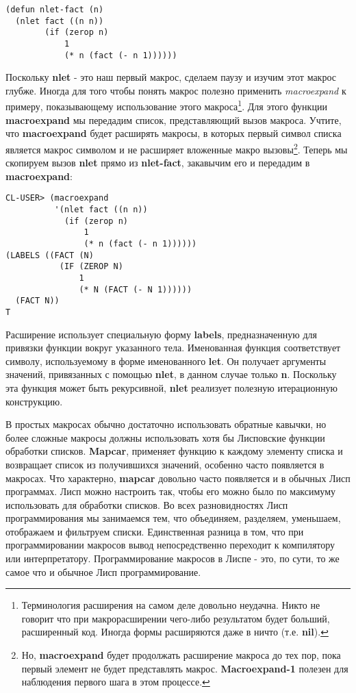 \begin{verbatim}
(defun nlet-fact (n)
  (nlet fact ((n n))
        (if (zerop n)
            1
            (* n (fact (- n 1))))))
\end{verbatim}

Поскольку \textbf{nlet} - это наш первый макрос, сделаем паузу и изучим этот макрос глубже. Иногда для того чтобы понять макрос полезно применить \emph{macroexpand} к примеру, показывающему использование этого макроса\footnote{Терминология расширения на самом деле довольно неудачна. Никто не говорит что при макрорасширении чего-либо результатом будет больший, расширенный код. Иногда формы расширяются даже в ничто (т.е. \textbf{nil}).}. Для этого функции \textbf{macroexpand} мы передадим список, представляющий вызов макроса. Учтите, что \textbf{macroexpand} будет расширять макросы, в которых первый символ списка является макрос символом и не расширяет вложенные макро вызовы\footnote{Но, \textbf{macroexpand} будет продолжать расширение макроса до тех пор, пока первый элемент не будет представлять макрос. \textbf{Macroexpand-1} полезен для наблюдения первого шага в этом процессе.}. Теперь мы скопируем вызов \textbf{nlet} прямо из \textbf{nlet-fact}, закавычим его и передадим в \textbf{macroexpand}:

\begin{verbatim}
CL-USER> (macroexpand
          '(nlet fact ((n n))
            (if (zerop n)
                1
                (* n (fact (- n 1))))))
(LABELS ((FACT (N)
           (IF (ZEROP N)
               1
               (* N (FACT (- N 1))))))
  (FACT N))
T
\end{verbatim}

Расширение использует специальную форму \textbf{labels}, предназначенную для привязки функции вокруг указанного тела. Именованная функция соответствует символу, используемому в форме именованного \textbf{let}. Он получает аргументы значений, привязанных с помощью \textbf{nlet}, в данном случае только \textbf{n}. Поскольку эта функция может быть рекурсивной, \textbf{nlet} реализует полезную итерационную конструкцию.

В простых макросах обычно достаточно использовать обратные кавычки, но более сложные макросы должны использовать хотя бы Лисповские функции обработки списков. \textbf{Mapcar}, применяет функцию к каждому элементу списка и возвращает список из получившихся значений, особенно часто появляется в макросах. Что характерно, \textbf{mapcar} довольно часто появляется и в обычных Лисп программах. Лисп можно настроить так, чтобы его можно было по максимуму использовать для обработки списков. Во всех разновидностях Лисп программирования мы занимаемся тем, что объединяем, разделяем, уменьшаем, отображаем и фильтруем списки. Единственная разница в том, что при программировании макросов вывод непосредственно переходит к компилятору или интерпретатору. Программирование макросов в Лиспе - это, по сути, то же самое что и обычное Лисп программирование.

